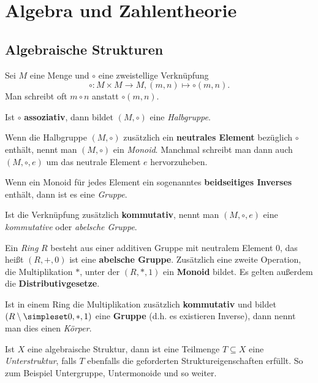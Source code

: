 
\newcommand{\ggT}{\texttt{ggT}}
\newcommand{\kgV}{\texttt{kgV}}

\chapter{Algebra und Zahlentheorie}
\section{Algebraische Strukturen}
	Sei $M$ eine Menge und $\circ$ eine zweistellige Verknüpfung
	\begin{equation*}
		\circ:M\times M\rightarrow M, (m,n)\mapsto \circ(m,n).
	\end{equation*}
	Man schreibt oft $m\circ n$ anstatt $\circ(m,n)$.

	Ist $\circ$ \textbf{assoziativ}, dann bildet $(M,\circ)$ eine \emph{Halbgruppe}.

	\medskip

	Wenn die Halbgruppe $(M,\circ)$ zusätzlich ein \textbf{neutrales Element} bezüglich $\circ$ enthält, nennt man $(M,\circ)$ ein \emph{Monoid}. Manchmal schreibt man dann auch $(M,\circ,e)$ um das neutrale Element $e$ hervorzuheben.

	\medskip

	Wenn ein Monoid für jedes Element ein sogenanntes \textbf{beidseitiges Inverses} enthält, dann ist es eine \emph{Gruppe}.

	\medskip

	Ist die Verknüpfung zusätzlich \textbf{kommutativ}, nennt man $(M,\circ, e)$ eine \emph{kommutative} oder \emph{abelsche Gruppe}.

	\bigskip

	Ein \emph{Ring} $R$ besteht aus einer additiven Gruppe mit neutralem Element $0$, das heißt $(R,+,0)$ ist eine \textbf{abelsche Gruppe}. Zusätzlich eine zweite Operation, die Multiplikation $*$, unter der $(R,*,1)$ ein \textbf{Monoid} bildet. Es gelten außerdem die \textbf{Distributivgesetze}.

	\medskip

	Ist in einem Ring die Multiplikation zusätzlich \textbf{kommutativ} und bildet $(R\setminus\simpleset 0, *,1)$ eine \textbf{Gruppe} (d.h. es existieren Inverse), dann nennt man dies einen \emph{Körper}.

	\bigskip

	Ist $X$ eine algebraische Struktur, dann ist eine Teilmenge $T\subseteq X$ eine \emph{Unterstruktur}, falls $T$ ebenfalls die geforderten Struktureigenschaften erfüllt. So zum Beispiel Untergruppe, Untermonoide und so weiter.

